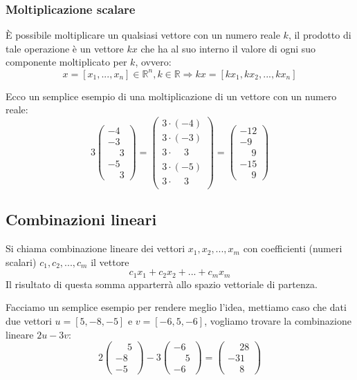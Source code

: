 \documentclass[../main.tex]{subfiles}
\begin{document}
\subsubsection{Moltiplicazione scalare}
È possibile moltiplicare un qualsiasi vettore con un numero reale $k$, il prodotto di tale operazione è un vettore $kx$ che ha al suo interno il valore di ogni suo componente moltiplicato per $k$, ovvero:
$$
    x=[x_1,...,x_n]\in \mathbb{R}^n, k\in \mathbb{R} \Rightarrow 
    kx=[kx_1,kx_2,...,kx_n]
$$

Ecco un semplice esempio di una moltiplicazione di un vettore con un numero reale:
$$
    3 \begin{pmatrix}
        -4 \\
        -3 \\
        \phantom{-}3 \\
        -5 \\
        \phantom{-}3
    \end{pmatrix} =
    \begin{pmatrix}
        3 \cdot (-4) \\
        3 \cdot (-3) \\
        3 \cdot \phantom{(-}3 \phantom{)}\\
        3 \cdot (-5) \\
        3 \cdot \phantom{(-}3 \phantom{)}
    \end{pmatrix} =
    \begin{pmatrix}
        -12 \\
        -9 \\
        \phantom{-}9 \\
        -15 \\
        \phantom{-}9
    \end{pmatrix}
$$    

\subsection{Combinazioni lineari}
Si chiama combinazione lineare dei vettori $x_1,x_2,...,x_m$ con coefficienti (numeri scalari) $c_1,c_2,...,c_m$ il vettore
$$
    c_1x_1+c_2x_2+...+c_mx_m
$$
Il risultato di questa somma apparterrà allo spazio vettoriale di partenza.
\vspace{1cm}

Facciamo un semplice esempio per rendere meglio l'idea, mettiamo caso che dati due vettori $u=[5, -8, -5]$ e $v=[-6, 5, -6]$, vogliamo trovare la combinazione lineare $2u-3v$:
$$
    2 \begin{pmatrix}
        \phantom{-}5 \\
        -8 \\
        -5
    \end{pmatrix} -3
    \begin{pmatrix}
        -6 \\
        \phantom{-}5 \\
        -6
    \end{pmatrix} = 
    \begin{pmatrix}
        \phantom{-}28 \\
        -31 \\
        \phantom{-}8
    \end{pmatrix}
$$
\end{document}
